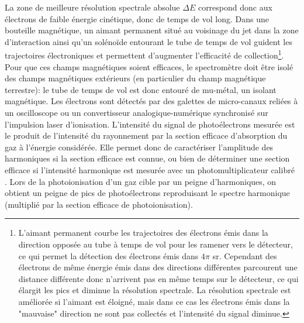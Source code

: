 La zone de meilleure résolution spectrale absolue $\Delta E$ correspond donc aux électrons de faible énergie cinétique, donc de temps de vol long. Dans une bouteille magnétique, un aimant permanent situé au voisinage du jet dans la zone d'interaction ainsi qu'un solénoïde entourant le tube de temps de vol guident les trajectoires électroniques et permettent d'augmenter l'efficacité de collection\footnote{L'aimant permanent courbe les trajectoires des électrons émis dans la direction opposée au tube à temps de vol pour les ramener vers le détecteur, ce qui permet la détection des électrons émis dans $4 \pi$ sr. Cependant des électrons de même énergie émis dans des directions différentes parcourent une distance différente donc n'arrivent pas en même temps sur le détecteur, ce qui élargit les pics et diminue la résolution spectrale. La résolution spectrale est améliorée si l'aimant est éloigné, mais dans ce cas les électrons émis dans la "mauvaise" direction ne sont pas collectés et l'intensité du signal diminue.}. Pour que ces champs magnétiques soient efficaces, le spectromètre doit être isolé des champs magnétiques extérieurs (en particulier du champ magnétique terrestre): le tube de temps de vol est donc entouré de mu-métal, un isolant magnétique. Les électrons sont détectés par des galettes de micro-canaux reliées à un oscilloscope ou un convertisseur analogique-numérique synchronisé sur l'impulsion laser d'ionisation. L'intensité du signal de photoélectrons mesurée est le produit de l'intensité du rayonnement par la section efficace d'absorption du gaz à l'énergie considérée. Elle permet donc de caractériser l'amplitude des harmoniques si la section efficace est connue, ou bien de déterminer une section efficace si l'intensité harmonique est mesurée avec un photomultiplicateur calibré . Lors de la photoionisation d'un gaz cible par un peigne d'harmoniques, on obtient un peigne de pics de photoélectrons reproduisant le spectre harmonique (multiplié par la section efficace de photoionisation).

